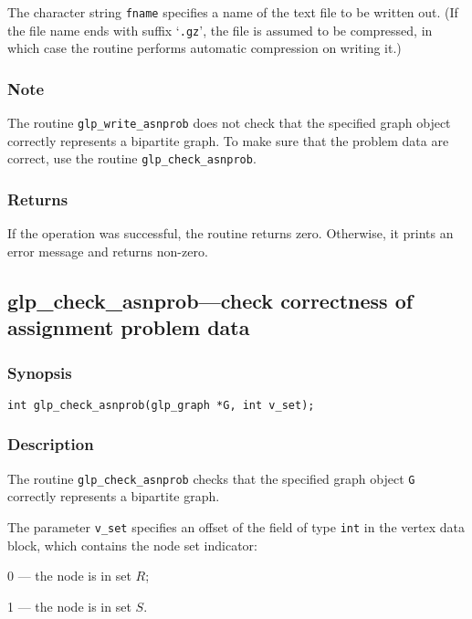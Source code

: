 \documentclass[dvipdfm,11pt]{report}
\begin{document}
The character string \verb|fname| specifies a name of the text file to
be written out. (If the file name ends with suffix `\verb|.gz|', the
file is assumed to be compressed, in which case the routine performs
automatic compression on writing it.)

\subsubsection*{Note}

The routine \verb|glp_write_asnprob| does not check that the specified
graph object correctly represents a bipartite graph. To make sure that
the problem data are correct, use the routine \verb|glp_check_asnprob|.

\subsubsection*{Returns}

If the operation was successful, the routine returns zero. Otherwise,
it prints an error message and returns non-zero.

\newpage

\subsection{glp\_check\_asnprob---check correctness of assignment
problem data}

\subsubsection*{Synopsis}

\begin{verbatim}
int glp_check_asnprob(glp_graph *G, int v_set);
\end{verbatim}

\subsubsection*{Description}

The routine \verb|glp_check_asnprob| checks that the specified graph
object \verb|G| correctly represents a bipartite graph.

The parameter \verb|v_set| specifies an offset of the field of type
\verb|int| in the vertex data block, which contains the node set
indicator:

0 --- the node is in set $R$;

1 --- the node is in set $S$.
\end{document}
